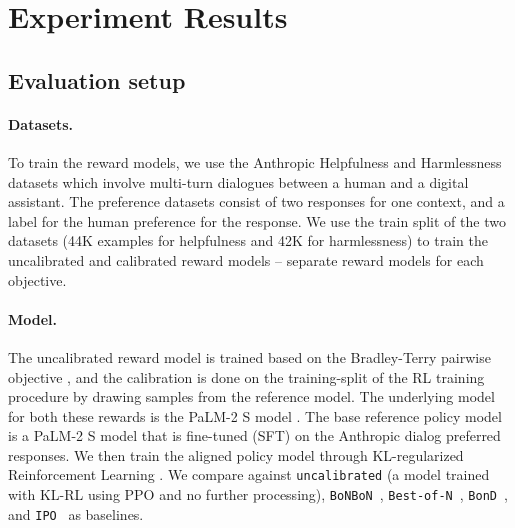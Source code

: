 \documentclass{article}
\begin{document}
%
%

%
%









\section{Experiment Results} \label{sec:results}


\subsection{Evaluation setup} \label{sec:evaluation}
\paragraph{Datasets.}
To train the reward models, we use the Anthropic Helpfulness and Harmlessness datasets \citep{bai2022training} which involve multi-turn dialogues between a human and a digital assistant. The preference datasets consist of
two responses for one context, and a label for the human preference for the response. We use the train split of the two datasets (44K examples for helpfulness and 42K for harmlessness) to train the uncalibrated and calibrated reward models -- separate reward models for each objective.

\paragraph{Model.}
The uncalibrated reward model is trained based on the Bradley-Terry pairwise objective \citep{raffel2020exploring}, and the calibration is done on the training-split of the RL training procedure by drawing samples from the reference model. The underlying model for both these rewards is the PaLM-2 S model \citep{anil2023PaLM}. The base reference policy model is a PaLM-2 S model that is fine-tuned (SFT) on the Anthropic dialog preferred responses. We then train the aligned policy model through KL-regularized Reinforcement Learning \citep{schulman2017proximal, bai2022training}. We compare against \texttt{uncalibrated} (a model trained with KL-RL using PPO and no further processing), \texttt{BoNBoN}~\citep{gui2024bonbonalignmentlargelanguage}, \texttt{Best-of-N}~\citep{nakano2022webgptbrowserassistedquestionansweringhuman, beirami2024theoretical}, \texttt{BonD}~\citep{sessa2024bondaligningllmsbestofn}, and \texttt{IPO}~\citep{azar2023general} as baselines.
\end{document}
